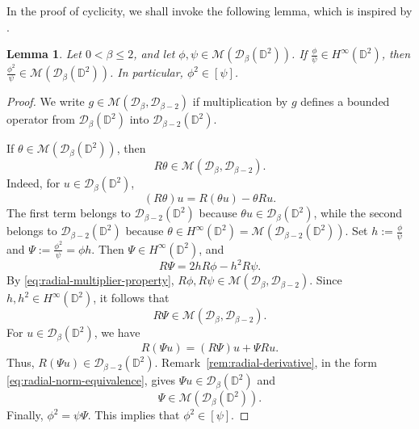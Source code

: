 \documentclass[a4paper,12pt]{amsart}
\newtheorem{lem}[thm]{Lemma}
\theoremstyle{definition}
\begin{document}
In the proof of cyclicity, we shall invoke the following lemma, which is inspired by
\cite[Lemma~5.3]{AlemanPerfektRichter}.

\begin{lem}
    Let \(0<\beta\leq 2\), and let
    \(\phi,\psi\in\mathcal{M}(\mathcal D_\beta(\mathbb{D}^2))\). If $\frac{\phi}{\psi}\in H^\infty(\mathbb{D}^2)$,
    then $\frac{\phi^2}{\psi}
        \in\mathcal{M}(\mathcal D_\beta(\mathbb{D}^2))$.
    In particular, $\phi^2\in[\psi]$.
    
    \label{Perfekt}
\end{lem}

\begin{proof}
    We write
    $g\in\mathcal{M}(\mathcal D_\beta,\mathcal D_{\beta-2})$
    if multiplication by \(g\) defines a bounded operator from
    \(\mathcal D_\beta(\mathbb{D}^2)\) into \(\mathcal D_{\beta-2}(\mathbb{D}^2)\).

    If \(\theta\in\mathcal{M}(\mathcal D_\beta(\mathbb{D}^2))\), then
    \begin{equation}
        R\theta\in\mathcal{M}(\mathcal D_\beta,\mathcal D_{\beta-2}).
        \label{eq:radial-multiplier-property}
    \end{equation}
    Indeed, for \(u\in \mathcal D_\beta(\mathbb{D}^2)\),
    \[
        (R\theta)u=R(\theta u)-\theta Ru.
    \]
    The first term belongs to \(\mathcal D_{\beta-2}(\mathbb{D}^2)\) because
    \(\theta u\in \mathcal D_\beta(\mathbb{D}^2)\), while the second belongs to
    \(\mathcal D_{\beta-2}(\mathbb{D}^2)\) because
    $\theta\in H^\infty(\mathbb{D}^2)
        =\mathcal{M}(\mathcal D_{\beta-2}(\mathbb{D}^2)).$
    Set $h:=\frac{\phi}{\psi}$ and $\Psi:=\frac{\phi^2}{\psi}=\phi h.$
    Then \(\Psi\in H^\infty(\mathbb{D}^2)\), and
    \[
        R\Psi=2hR\phi-h^2R\psi.
    \]
    By \eqref{eq:radial-multiplier-property},
    $R\phi,R\psi\in\mathcal{M}(\mathcal D_\beta,\mathcal D_{\beta-2})$. Since
    \(h,h^2\in H^\infty(\mathbb{D}^2)\), it follows that
    \[
        R\Psi\in\mathcal{M}(\mathcal D_\beta,\mathcal D_{\beta-2}).
    \]
    For $u \in \mathcal D_\beta(\mathbb{D}^2)$, we have
    \[
        R(\Psi u)=(R\Psi)u+\Psi Ru.
    \]
    Thus, $R(\Psi u)\in \mathcal D_{\beta-2}(\mathbb{D}^2)$.
    Remark~\ref{rem:radial-derivative}, in the form
    \eqref{eq:radial-norm-equivalence}, gives
    $\Psi u\in \mathcal D_\beta(\mathbb{D}^2)$ and
    \[
        \Psi\in\mathcal{M}(\mathcal D_\beta(\mathbb{D}^2)).
    \]
    Finally,
    $
        \phi^2=\psi\Psi.
    $
    This implies that
    \(\phi^2\in[\psi]\).
\end{proof}
\end{document}

